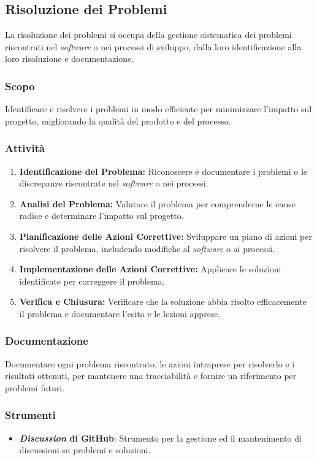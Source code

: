 \subsection{Risoluzione dei Problemi}

La risoluzione dei problemi si occupa della gestione sistematica dei problemi
riscontrati nel \textit{software} o nei processi di sviluppo, dalla loro
identificazione alla loro risoluzione e documentazione.

\subsubsection{Scopo}
Identificare e risolvere i problemi in modo efficiente per minimizzare l'impatto
sul progetto, migliorando la qualità del prodotto e del processo.

\subsubsection{Attività}
\begin{enumerate}
	\item \textbf{Identificazione del Problema:} Riconoscere e documentare i
	      problemi o le discrepanze riscontrate nel \textit{software} o nei
	      processi.
	\item \textbf{Analisi del Problema:} Valutare il problema per comprenderne
	      le cause radice e determinare l'impatto sul progetto.
	\item \textbf{Pianificazione delle Azioni Correttive:} Sviluppare un piano
	      di azioni per risolvere il problema, includendo modifiche al
	      \textit{software} o ai processi.
	\item \textbf{Implementazione delle Azioni Correttive:} Applicare le
	      soluzioni identificate per correggere il problema.
	\item \textbf{Verifica e Chiusura:} Verificare che la soluzione abbia
	      risolto efficacemente il problema e documentare l'esito e le lezioni
	      apprese.
\end{enumerate}

\subsubsection{Documentazione}
Documentare ogni problema riscontrato, le azioni intraprese per risolverlo e i
risultati ottenuti, per mantenere una tracciabilità e fornire un riferimento
per problemi futuri.

\subsubsection{Strumenti}
\begin{itemize}
	\item \textbf{\textit{Discussion} di GitHub}: Strumento per la gestione ed
	      il mantenimento di discussioni su problemi e soluzioni.
\end{itemize}
